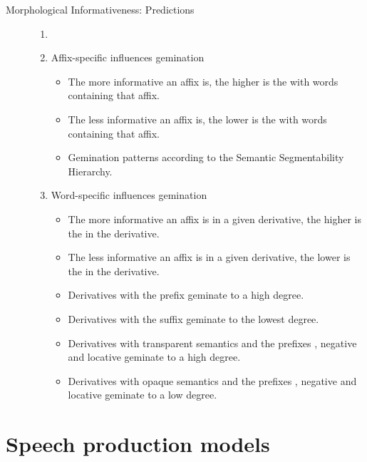 \begin{description}
\item[Morphological Informativeness: Predictions]
    \begin{enumerate}[label=\Alph*:,leftmargin=*]
        \item[]
        \item Affix-specific  influences gemination
            \begin{itemize}[leftmargin=*]
                \item The more informative an affix is, the higher is the  with words containing that affix.
                \item The less informative an affix is, the lower is the  with words containing that affix. 
                \item Gemination patterns according to the Semantic Segmentability Hierarchy.
            \end{itemize}
        \item Word-specific  influences gemination
			\begin{itemize}[leftmargin=*]
                \item The more informative an affix is in a given derivative, the higher is the  in the derivative.
                \item The less informative an affix is in a given derivative, the lower is the  in the derivative.%
				\item Derivatives with the prefix  geminate to a high degree.		
				\item Derivatives with the suffix  geminate to the lowest degree.
				\item  Derivatives with transparent semantics and the prefixes , negative  and locative  geminate to a high degree.	
				\item  Derivatives with opaque semantics and the prefixes , negative  and locative  geminate to a low degree.
			\end{itemize}
    \end{enumerate}
\end{description}
 
\section{Speech production models}\label{speech production models}

